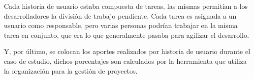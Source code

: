 Cada historia de usuario estaba compuesta de tareas, las mismas permitían a los desarrolladores la división de trabajo pendiente. Cada tarea es asignada a un usuario como responsable, pero varias personas podrían trabajar en la misma tarea en conjunto, que era lo que generalmente pasaba para agilizar el desarrollo.

Y, por último, se colocan los aportes realizados por historia de usuario durante el caso de estudio, dichos porcentajes son calculados por la herramienta que utiliza la organización para la gestión de proyectos.